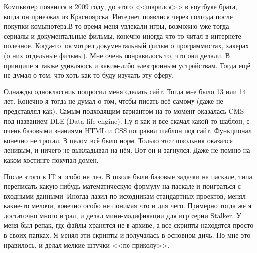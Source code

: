Компьютер появился в 2009 году, до этого <<шарился>> в ноутбуке брата, когда он приезжал из Красноярска. Интернет появлися через полгода после покупки комьпютера.В то время меня увлекали игры, возможно уже тогда сериалы и документальные фильмы, конечно иногда что-то читал в интернете полезное. Когда-то посмотрел документальный фильм о программистах, хакерах (о них отдельные фильмы). Мне очень понравилось то, что они делали. В принципе я также удивляюсь и каким-либо электронным устройствам. Тогда ещё не думал о том, что хоть как-то буду изучать эту сферу.

Однажды одноклассник попросил меня сделать сайт. Тогда мне было 13 или 14 лет. Конечно я тогда не думал о том, чтобы писать всё самому (даже не представлял как). Самым подходящим вариантом на то момент оказалась CMS под названием DLE (Data life engine). Ну я как и все скачал какой-то шаблон, с очень базовыми знаниями HTML и CSS поправил шаблон под сайт. Функционал конечно не трогал. В целом всё было норм. Только этот школьник оказался ленивым, и ничего не выкладывал на нём. Вот он и загнулся. Даже не помню на каком хостинге покупал домен.

После этого в IT я особо не лез. В школе были базовые задачки на паскале, типа переписать какую-нибудь математическую формулу на паскале и поиграться с входными данными. Иногда лазил по исходникам стандартных проектов, менял какие-то мелочи, конечно особо не понимая что и для чего. Примерно тогда же я достаточно много играл, и делал мини-модификации для игр серии Stalker. У меня был репак, где файлы хранятся не в архиве, а все скрипты находятся просто в своих папках. Я менял эти скрипты и получалась в основном дичь. Но мне это нравилось, и делал мелкие штучки <<по приколу>>. 

